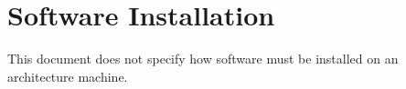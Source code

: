 
\chapter{Software Installation}

This document does not specify how software must be installed
on an \xARCH architecture machine.

